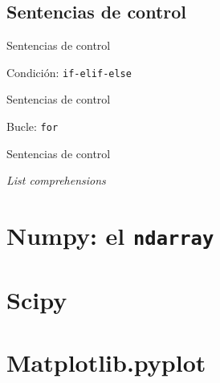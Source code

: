 \documentclass{beamer}
\begin{document}
\subsection{Sentencias de control}

\begin{frame}{Sentencias de control}

\begin{exampleblock}{Condición: \texttt{if-elif-else}}
	
\end{exampleblock}

\end{frame}

\begin{frame}{Sentencias de control}

	\begin{exampleblock}{Bucle: \texttt{for}}
		
	\end{exampleblock}
	
\end{frame}

\begin{frame}{Sentencias de control}

	\begin{exampleblock}{\textsl{List comprehensions}}
		
	\end{exampleblock}
	
\end{frame}

\section{Numpy: el \texttt{ndarray}}

\section{Scipy}

\section{Matplotlib.pyplot}
\end{document}
